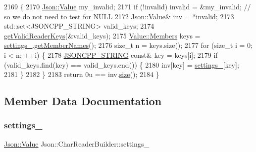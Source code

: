 \begin{DoxyCode}
2169 \{
2170   \hyperlink{class_json_1_1_value}{Json::Value} my\_invalid;
2171   \textcolor{keywordflow}{if} (!invalid) invalid = &my\_invalid;  \textcolor{comment}{// so we do not need to test for NULL}
2172   \hyperlink{class_json_1_1_value}{Json::Value}& inv = *invalid;
2173   std::set<JSONCPP\_STRING> valid\_keys;
2174   \hyperlink{namespace_json_a8c38450840f3d88e9b981ae132f7ad0a}{getValidReaderKeys}(&valid\_keys);
2175   \hyperlink{class_json_1_1_value_a9ae9069983fc38f1928d76f9c79ac64d}{Value::Members} keys = \hyperlink{class_json_1_1_char_reader_builder_ac69b7911ad64c171c51ebaf2ea26d958}{settings\_}.\hyperlink{class_json_1_1_value_a79d7725dce6260317333e69022367ac9}{getMemberNames}();
2176   \textcolor{keywordtype}{size\_t} n = keys.size();
2177   \textcolor{keywordflow}{for} (\textcolor{keywordtype}{size\_t} i = 0; i < n; ++i) \{
2178     \hyperlink{json_8h_a1e723f95759de062585bc4a8fd3fa4be}{JSONCPP\_STRING} \textcolor{keyword}{const}& key = keys[i];
2179     \textcolor{keywordflow}{if} (valid\_keys.find(key) == valid\_keys.end()) \{
2180       inv[key] = \hyperlink{class_json_1_1_char_reader_builder_ac69b7911ad64c171c51ebaf2ea26d958}{settings\_}[key];
2181     \}
2182   \}
2183   \textcolor{keywordflow}{return} 0u == inv.\hyperlink{class_json_1_1_value_a0ec2808e1d7efa4e9fad938d6667be44}{size}();
2184 \}
\end{DoxyCode}


\subsection{Member Data Documentation}
\mbox{\label{class_json_1_1_char_reader_builder_ac69b7911ad64c171c51ebaf2ea26d958}} 
\subsubsection{\texorpdfstring{settings\+\_\+}{settings\_}}
{\footnotesize\ttfamily \hyperlink{class_json_1_1_value}{Json\+::\+Value} Json\+::\+Char\+Reader\+Builder\+::settings\+\_\+}

